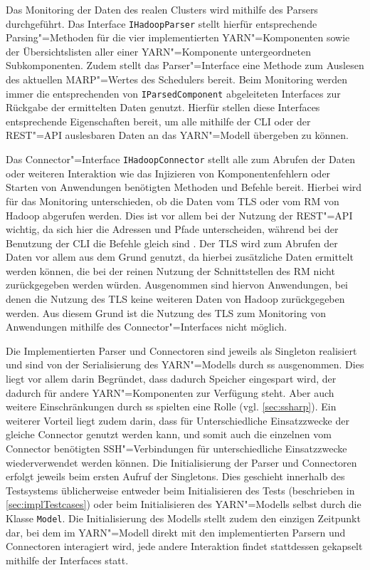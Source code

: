 Das Monitoring der Daten des realen Clusters wird mithilfe des Parsers durchgeführt.
Das Interface \texttt{IHadoopParser} stellt hierfür entsprechende Parsing"=Methoden für die vier implementierten YARN"=Komponenten sowie der Übersichtslisten aller einer YARN"=Komponente untergeordneten Subkomponenten.
Zudem stellt das Parser"=Interface eine Methode zum Auslesen des aktuellen \ac{MARP}"=Wertes des Schedulers bereit.
Beim Monitoring werden immer die entsprechenden von \texttt{IParsedComponent} abgeleiteten Interfaces zur Rückgabe der ermittelten Daten genutzt.
Hierfür stellen diese Interfaces entsprechende Eigenschaften bereit, um alle mithilfe der CLI oder der REST"=API auslesbaren Daten an das YARN"=Modell übergeben zu können.

Das Connector"=Interface \texttt{IHadoopConnector} stellt alle zum Abrufen der Daten oder weiteren Interaktion wie das Injizieren von Komponentenfehlern oder Starten von Anwendungen benötigten Methoden und Befehle bereit.
Hierbei wird für das Monitoring unterschieden, ob die Daten vom \ac{TLS} oder vom \ac{RM} von Hadoop abgerufen werden.
Dies ist vor allem bei der Nutzung der REST"=API wichtig, da sich hier die Adressen und Pfade unterscheiden, während bei der Benutzung der CLI die Befehle gleich sind .
Der \ac{TLS} wird zum Abrufen der Daten vor allem aus dem Grund genutzt, da hierbei zusätzliche Daten ermittelt werden können, die bei der reinen Nutzung der Schnittstellen des \ac{RM} nicht zurückgegeben werden würden.
Ausgenommen sind hiervon Anwendungen, bei denen die Nutzung des \ac{TLS} keine weiteren Daten von Hadoop zurückgegeben werden\cite{HadoopYarnTlServer271,HadoopYarnCmds271,HadoopRmApi271,HadoopNmApi271}.
Aus diesem Grund ist die Nutzung des \ac{TLS} zum Monitoring von Anwendungen mithilfe des Connector"=Interfaces nicht möglich.

Die Implementierten Parser und Connectoren sind jeweils als Singleton realisiert und sind von der Serialisierung des YARN"=Modells durch \ac{ss} ausgenommen.
Dies liegt vor allem darin Begründet, dass dadurch Speicher eingespart wird, der dadurch für andere YARN"=Komponenten zur Verfügung steht.
Aber auch weitere Einschränkungen durch \ac{ss} spielten eine Rolle (vgl. \cref{sec:ssharp}).
Ein weiterer Vorteil liegt zudem darin, dass für Unterschiedliche Einsatzzwecke der gleiche Connector genutzt werden kann, und somit auch die einzelnen vom Connector benötigten SSH"=Verbindungen für unterschiedliche Einsatzzwecke wiederverwendet werden können.
Die Initialisierung der Parser und Connectoren erfolgt jeweils beim ersten Aufruf der Singletons.
Dies geschieht innerhalb des Testsystems üblicherweise entweder beim Initialisieren des Tests (beschrieben in \cref{sec:implTestcases}) oder beim Initialisieren des YARN"=Modells selbst durch die Klasse \texttt{Model}.
Die Initialisierung des Modells stellt zudem den einzigen Zeitpunkt dar, bei dem im YARN"=Modell direkt mit den implementierten Parsern und Connectoren interagiert wird, jede andere Interaktion findet stattdessen gekapselt mithilfe der Interfaces statt.

